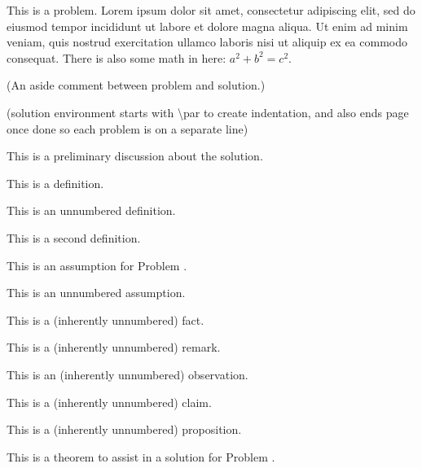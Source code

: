 \documentclass{article}
\begin{document}
\begin{problem} 
    This is a problem. Lorem ipsum dolor sit amet, consectetur adipiscing elit, sed do eiusmod tempor incididunt ut labore et dolore magna aliqua. Ut enim ad minim veniam, quis nostrud exercitation ullamco laboris nisi ut aliquip ex ea commodo consequat. There is also some math in here: $a^2 + b^2 = c^2$.
\end{problem}
(An aside comment between problem and solution.)
\begin{solution}
    (solution environment starts with \textbackslash{par} to create indentation, and also ends page once done so each problem is on a separate line)
    \par This is a preliminary discussion about the solution.
    \begin{definition}
        This is a definition.
    \end{definition}
    \begin{definition*}
        This is an unnumbered definition.
    \end{definition*}
    \begin{definition}
        This is a second definition.
    \end{definition}
    \begin{assumption}
        This is an assumption for Problem \theproblem.
    \end{assumption}
    \begin{assumption*}
        This is an unnumbered assumption.
    \end{assumption*}
    \begin{fact}
        This is a (inherently unnumbered) fact.
    \end{fact}
    \begin{remark}
        This is a (inherently unnumbered) remark.
    \end{remark}
    \begin{observation}
        This is an (inherently unnumbered) observation.
    \end{observation}
    \begin{claim}
        This is a (inherently unnumbered) claim.
    \end{claim}
    \begin{proposition}
        This is a (inherently unnumbered) proposition.
    \end{proposition}
    \begin{theorem}\label{babys-first-theorem}
        This is a theorem to assist in a solution for Problem \theproblem.

\end{theorem}
\end{solution}
\end{document}
